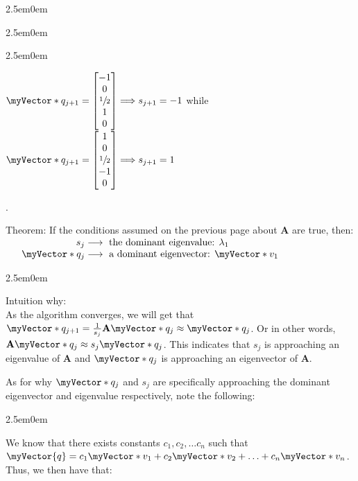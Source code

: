 \documentclass{book}
\newcommand{\hThree}{%
   \color{PineGreen}
   \fontsize{13}{15}\selectfont%
}
\newcommand{\hFour}{%
   \color{Cerulean}
   \fontsize{12}{14}\selectfont%
}
\newenvironment{myIndent}{%
   \begin{adjustwidth}{2.5em}{0em}%
}{%
   \end{adjustwidth}%
}
\newcommand{\uuline}[2][.]{%
{\vphantom{a}\color{#1}%
\rlap{\rule[-0.18em]{\widthof{#2}}{0.06em}}%
\rlap{\rule[-0.32em]{\widthof{#2}}{0.06em}}}%
#2}
\newcommand{\retTwo}{\hfill\bigbreak}
\newcommand{\mVec}[1]{\myVector{#1}}
\newcommand{\mVecAst}[1]{\myVector*{#1}}
\newcommand{\mMat}[1]{\mathbf{#1}}
\begin{document}
{\begin{myIndent}
\begin{myIndent}
\begin{itemize}
{\begin{myIndent}
               {\center $\mVecAst{q}_{j+1} = 
               \begin{bmatrix}
                  -1 \\ 0 \\ \sfrac{1}{2} \\ 1 \\ 0
               \end{bmatrix} \Longrightarrow s_{j+1} = -1$ while $\mVecAst{q}_{j+1} = 
               \begin{bmatrix}
                  1 \\ 0 \\ \sfrac{1}{2} \\ -1 \\ 0
               \end{bmatrix} \Longrightarrow s_{j+1} = 1$ \retTwo\par}.
            \end{myIndent}}
         \end{itemize}
         \retTwo
      \end{myIndent}

      \uuline{Theorem}: If the conditions assumed on the previous page about $\mMat{A}$ are true, then:\\
      ${\displaystyle \begin{matrix}
         \phantom{aaaa}s_{j} \longrightarrow \text{ the dominant eigenvalue: } \lambda_1 \\
         \phantom{aaa}\mVecAst{q}_{j} \longrightarrow \text{ a dominant eigenvector: } \mVecAst{v}_1
      \end{matrix}}$\retTwo

      {\begin{myIndent} \hThree
         Intuition why:\\
         As the algorithm converges, we will get that $\mVecAst{q}_{j+1} = \frac{1}{s_j}\mMat{A}\mVecAst{q}_{j} \approx \mVecAst{q}_{j}$. Or in other words, $\mMat{A}\mVecAst{q}_{j} \approx s_j\mVecAst{q}_{j}$. This indicates that $s_j$ is approaching an eigenvalue of $\mMat{A}$ and $\mVecAst{q}_j$ is approaching an eigenvector of $\mMat{A}$. \retTwo

         As for why $\mVecAst{q}_j$ and $s_j$ are specifically approaching the dominant eigenvector and eigenvalue respectively, note the following:
         
         \begin{myIndent} \hFour
            We know that there exists constants $c_1, c_2, \ldots c_n$ such that\\ $\mVec{q} = c_1\mVecAst{v}_1 + c_2\mVecAst{v}_2 + \ldots + c_n\mVecAst{v}_n$. Thus, we then have that:\\
            

\end{myIndent}
\end{myIndent}}
\end{myIndent}}
\end{document}
